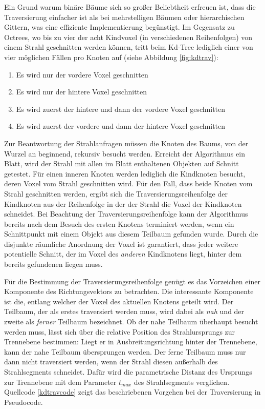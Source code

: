 Ein Grund warum binäre Bäume sich so großer Beliebtheit erfreuen ist, dass die Traversierung einfacher ist als bei mehrstelligen Bäumen oder hierarchischen Gittern, was eine effiziente Implementierung begünstigt. Im Gegensatz zu Octrees, wo bis zu vier der acht Kindvoxel (in verschiedenen Reihenfolgen) von einem Strahl geschnitten werden können, tritt beim Kd-Tree lediglich einer von vier möglichen Fällen pro Knoten auf (siehe Abbildung \ref{fig:kdtrav}):
\begin{enumerate}
 \item Es wird nur der vordere Voxel geschnitten
 \item Es wird nur der hintere Voxel geschnitten
 \item Es wird zuerst der hintere und dann der vordere Voxel geschnitten
 \item Es wird zuerst der vordere und dann der hintere Voxel geschnitten
\end{enumerate}

Zur Beantwortung der Strahlanfragen müssen die Knoten des Baums, von der Wurzel an beginnend, rekursiv besucht werden. Erreicht der Algorithmus ein Blatt, wird der Strahl mit allen im Blatt enthaltenen Objekten auf Schnitt getestet.
Für einen inneren Knoten werden lediglich die Kindknoten besucht, deren Voxel vom Strahl geschnitten wird. Für den Fall, dass beide Knoten vom Strahl geschnitten werden, ergibt sich die Traversierungsreihenfolge der Kindknoten aus der Reihenfolge in der der Strahl die Voxel der Kindknoten schneidet.
Bei Beachtung der Traversierungsreihenfolge kann der Algorithmus bereits nach dem Besuch des ersten Knotens terminiert werden, wenn ein Schnittpunkt mit einem Objekt aus diesem Teilbaum gefunden wurde. Durch die disjunkte räumliche Anordnung der Voxel ist garantiert, dass jeder weitere potentielle Schnitt, der im Voxel des \textit{anderen} Kindknotens liegt, hinter dem bereits gefundenen liegen muss.

Für die Bestimmung der Traversierungsreihenfolge genügt es das Vorzeichen einer Komponente des Richtungsvektors zu betrachten. Die interessante Komponente ist die, entlang welcher der Voxel des aktuellen Knotens geteilt wird. Der Teilbaum, der als erstes traversiert werden muss, wird dabei als \textit{nah} und der zweite als \textit{ferner} Teilbaum bezeichnet.
Ob der nahe Teilbaum überhaupt besucht werden muss, lässt sich über die relative Position des Strahlursprungs zur Trennebene bestimmen: Liegt er in Ausbreitungsrichtung hinter der Trennebene, kann der nahe Teilbaum übersprungen werden. Der ferne Teilbaum muss nur dann nicht traversiert werden, wenn der Strahl diesen außerhalb des Strahlsegments schneidet. Dafür wird die parametrische Distanz des Ursprungs zur Trennebene mit dem Parameter $t_{max}$ des Strahlsegments verglichen. 
Quellcode \ref{kdtravcode} zeigt das beschriebenen Vorgehen bei der Traversierung in Pseudocode.

